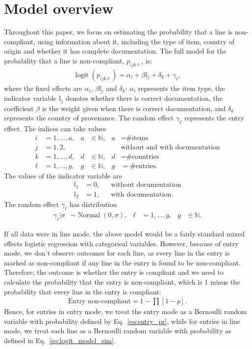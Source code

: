 \documentclass{article}
\DeclareMathOperator{\logit}{logit}
\DeclareMathOperator{\Normal}{Normal}
\begin{document}
\section{Model overview}\label{sec:model}
Throughout this paper, we focus on estimating the probability that a line is non-compliant, using information about it, including the type of item, country of origin and whether it has complete documentation. The full model for the probability that a line is non-compliant, \(p_{ijk\ell}\),  is: 
\begin{align}
\logit(p_{ijk\ell}) = \alpha_{i} + \beta\mathbb{I}_j + \delta_k + \gamma_\ell \label{eq:logit_model_sim},
\end{align}
where the fixed effects are $\alpha_i$, $\beta\mathbb{I}_j$ and $\delta_k$: $\alpha_i$ represents the item type, the indicator variable $\mathbb{I}_j$ denotes whether there is correct documentation, the coefficient $\beta$ is the weight given when there is correct documentation, and $\delta_k$ represents the country of provenance. The random effect $\gamma_\ell$ represents the entry effect. The indices can take values
\begin{align}
i &=1, \ldots, a, & a&\in \mathbb{N},& a &= \text{\# items}\\
j &= 1, 2, & & & &\text{without and with documentation}\\
k &= 1,\ldots, d,& d &\in \mathbb{N},& d &= \text{\# countries}\\
\ell &= 1,\ldots,g,& g&\in \mathbb{N},& g &= \text{\# entries}.
\end{align}
The values of the indicator variable are
\begin{align}
\mathbb{I}_1 & = 0,& &\text{without documentation}\\
\mathbb{I}_2 &= 1,& &\text{with documentation}.
\end{align}
The random effect $\gamma_\ell$ has distribution
\begin{align}
\gamma_\ell | \sigma &\sim \Normal(0, \sigma), & \ell &= 1,\ldots, g, & g&\in \mathbb{N}.
\label{eq:entry_effect}
\end{align}

If all data were in line mode, the above model would be a fairly standard mixed effects logistic regression with categorical variables. However, because of entry mode, we don't observe outcomes for each line, as every line in the entry is marked as non-compliant if any line in the entry is found to be non-compliant. Therefore, the outcome is whether the entry is compliant and we need to calculate the probability that the entry is non-compliant, which is 1 minus the probability that every line in the entry is compliant:
\begin{align}
\text{Entry non-compliant} = 1-\prod[1-p].\label{eq:entry_pr}
\end{align}
Hence, for entries in entry mode, we treat the entry mode as a Bernoulli random variable with probability defined by Eq.~\eqref{eq:entry_pr}, while for entries in line mode, we treat each line as a Bernoulli random variable with probability as defined in Eq.~\eqref{eq:logit_model_sim}.
\end{document}
